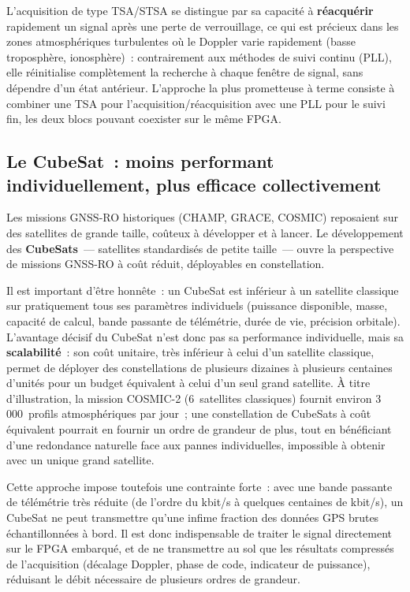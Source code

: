 \documentclass[11pt,a4paper]{article}
\begin{document}
L'acquisition de type TSA/STSA se distingue par sa capacité à \textbf{réacquérir} rapidement un signal après une perte de verrouillage, ce qui est précieux dans les zones atmosphériques turbulentes où le Doppler varie rapidement (basse troposphère, ionosphère)~: contrairement aux méthodes de suivi continu (PLL), elle réinitialise complètement la recherche à chaque fenêtre de signal, sans dépendre d'un état antérieur. L'approche la plus prometteuse à terme consiste à combiner une TSA pour l'acquisition/réacquisition avec une PLL pour le suivi fin, les deux blocs pouvant coexister sur le même FPGA.

\subsection{Le CubeSat~: moins performant individuellement, plus efficace collectivement}

Les missions GNSS-RO historiques (CHAMP, GRACE, COSMIC) reposaient sur des satellites de grande taille, coûteux à développer et à lancer. Le développement des \textbf{CubeSats}~--- satellites standardisés de petite taille~--- ouvre la perspective de missions GNSS-RO à coût réduit, déployables en constellation.

Il est important d'être honnête~: un CubeSat est inférieur à un satellite classique sur pratiquement tous ses paramètres individuels (puissance disponible, masse, capacité de calcul, bande passante de télémétrie, durée de vie, précision orbitale). L'avantage décisif du CubeSat n'est donc pas sa performance individuelle, mais sa \textbf{scalabilité}~: son coût unitaire, très inférieur à celui d'un satellite classique, permet de déployer des constellations de plusieurs dizaines à plusieurs centaines d'unités pour un budget équivalent à celui d'un seul grand satellite. À titre d'illustration, la mission COSMIC-2 (6~satellites classiques) fournit environ 3\,000~profils atmosphériques par jour~; une constellation de CubeSats à coût équivalent pourrait en fournir un ordre de grandeur de plus, tout en bénéficiant d'une redondance naturelle face aux pannes individuelles, impossible à obtenir avec un unique grand satellite.

Cette approche impose toutefois une contrainte forte~: avec une bande passante de télémétrie très réduite (de l'ordre du kbit/s à quelques centaines de kbit/s), un CubeSat ne peut transmettre qu'une infime fraction des données GPS brutes échantillonnées à bord. Il est donc indispensable de traiter le signal directement sur le FPGA embarqué, et de ne transmettre au sol que les résultats compressés de l'acquisition (décalage Doppler, phase de code, indicateur de puissance), réduisant le débit nécessaire de plusieurs ordres de grandeur.
\end{document}
